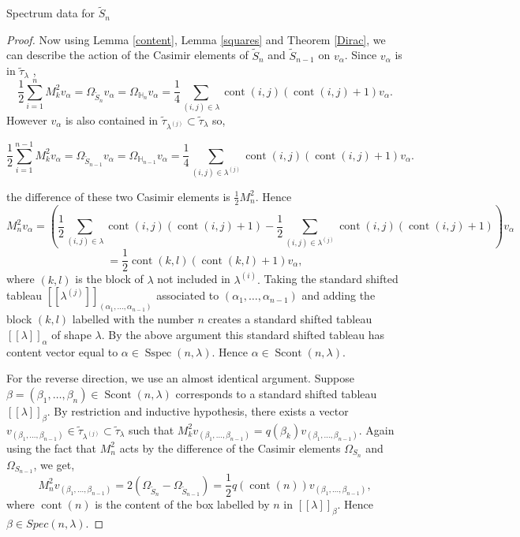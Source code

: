 \documentclass[a4paper,10pt]{amsart}
\DeclareMathOperator{\cont}{cont}
\DeclareMathOperator{\Sspec}{Sspec}
\DeclareMathOperator{\Scont}{Scont}
\begin{document}
\begin{section}{Spectrum data for $\tilde{S}_n$}
\begin{proof}
Now using Lemma \ref{content}, Lemma \ref{squares} and Theorem \ref{Dirac}, we can describe the action of the Casimir elements of $\tilde{S}_n$ and $\tilde{S}_{n-1}$ on $v_\alpha$. Since $v_\alpha$ is in $\tilde{\tau}_\lambda$ ,
 $$ \frac{1}{2}\sum_{i=1}^n M_k^2 v_\alpha = \Omega_{\tilde{S}_n} v_\alpha= \Omega_{\mathbb{H}_n}v_\alpha =\frac{1}{4} \sum_{(i,j) \in \lambda}  \cont(i,j)(\cont(i,j)+1)v_\alpha. $$ 
 However $v_\alpha$ is also contained in $\tilde{\tau}_{\lambda^{(j)}}\subset \tilde{\tau}_\lambda$ so,

 $$\frac{1}{2} \sum_{i=1}^{n-1} M_k^2v_\alpha = \Omega_{\tilde{S}_{n-1}} v_\alpha= \Omega_{\mathbb{H}_{n-1}}v_\alpha =\frac{1}{4} \sum_{(i,j) \in \lambda^{(j)}}  \cont(i,j)(\cont(i,j)+1)v_\alpha.$$
 
 
  the difference of these two Casimir elements is $\frac{1}{2}M_n^2$. Hence
 $$M_n^2 v_\alpha = \left(\frac{1}{2}\sum_{(i,j) \in \lambda}  \cont(i,j)(\cont(i,j)+1) - \frac{1}{2}\sum_{(i,j) \in \lambda^{(j)}}  \cont(i,j)(\cont(i,j)+1) \right) v_\alpha$$
 $$ =\frac{1}{2} \cont(k,l)(\cont(k,l)+ 1)v_\alpha,$$  where $(k,l)$ is the block of $ \lambda $ not included in $ \lambda^{(i)}.$
Taking the standard shifted tableau $[[\lambda^{(j)}]]_{(\alpha_1,\ldots ,\alpha_{n-1})}$ associated to $(\alpha_1,\ldots ,\alpha_{n-1})$ and adding the block $(k,l)$ labelled with the number $n$ creates a standard shifted tableau $[[\lambda]]_\alpha$ of shape $\lambda$. By the above argument this standard shifted tableau has content vector equal to $\alpha \in \Sspec(n,\lambda)$. Hence $\alpha \in \Scont(n,\lambda)$. 


For the reverse direction, we use an almost identical argument. Suppose $\beta =(\beta_1,\ldots ,\beta_n) \in \Scont(n,\lambda)$  corresponds to a standard shifted tableau $[[\lambda]]_\beta$. By restriction and inductive hypothesis, there exists a vector $v_{(\beta_1,\ldots ,\beta_{n-1})} \in \tilde{\tau}_{\lambda^{(j)}} \subset \tilde{\tau}_\lambda$ such that $M_k^2 v_{(\beta_1,\ldots ,\beta_{n-1})} = q(\beta_k) v_{(\beta_1,\ldots ,\beta_{n-1})}$. 
Again using the fact that $M_n^2$ acts by the difference of the Casimir elements $\Omega_{S_n}$ and $\Omega_{S_{n-1}}$, we get, $$M_n^2 v_{(\beta_1,\ldots ,\beta_{n-1})} = 2(\Omega_{\tilde{S}_n} - \Omega_{\tilde{S}_{n-1}})   = \frac{1}{2}q(\cont(n))v_{(\beta_1,\ldots ,\beta_{n-1})},$$ where $\cont(n)$ is the content of the box labelled by $n$ in $[[\lambda]]_\beta$. Hence $\beta \in Spec(n,\lambda)$. 

\end{proof}



\end{section}
\end{document}
